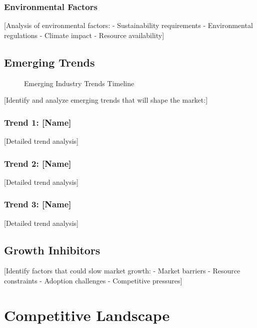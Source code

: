 \documentclass[11pt,letterpaper]{report}
\begin{document}
\subsection{Environmental Factors}
[Analysis of environmental factors:
- Sustainability requirements
- Environmental regulations
- Climate impact
- Resource availability]

\section{Emerging Trends}


\begin{figure}[htbp]
\centering
\caption{Emerging Industry Trends Timeline}
\label{fig:trends}
\end{figure}

[Identify and analyze emerging trends that will shape the market:]

\subsection{Trend 1: [Name]}
[Detailed trend analysis]

\subsection{Trend 2: [Name]}
[Detailed trend analysis]

\subsection{Trend 3: [Name]}
[Detailed trend analysis]

\section{Growth Inhibitors}

[Identify factors that could slow market growth:
- Market barriers
- Resource constraints
- Adoption challenges
- Competitive pressures]

\chapter{Competitive Landscape}
\end{document}
